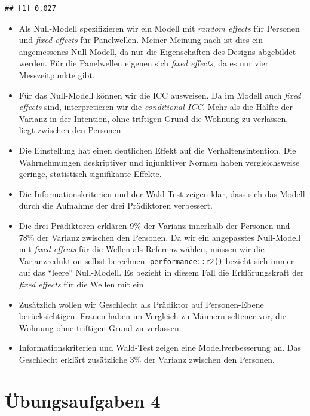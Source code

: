 \documentclass[
]{book}
\begin{document}
\begin{verbatim}
## [1] 0.027
\end{verbatim}

\begin{itemize}
\item
  Als Null-Modell spezifizieren wir ein Modell mit \emph{random effects} für Personen und \emph{fixed effects} für Panelwellen. Meiner Meinung nach ist dies ein angemessenes Null-Modell, da nur die Eigenschaften des Designs abgebildet werden. Für die Panelwellen eigenen sich \emph{fixed effects}, da es nur vier Messzeitpunkte gibt.
\item
  Für das Null-Modell können wir die ICC ausweisen. Da im Modell auch \emph{fixed effects} sind, interpretieren wir die \emph{conditional ICC}. Mehr als die Hälfte der Varianz in der Intention, ohne triftigen Grund die Wohnung zu verlassen, liegt zwischen den Personen.
\item
  Die Einstellung hat einen deutlichen Effekt auf die Verhaltensintention. Die Wahrnehmungen deskriptiver und injunktiver Normen haben vergleichsweise geringe, statistisch signifikante Effekte.
\item
  Die Informationskriterien und der Wald-Test zeigen klar, dass sich das Modell durch die Aufnahme der drei Prädiktoren verbessert.
\item
  Die drei Prädiktoren erklären 9\% der Varianz innerhalb der Personen und 78\% der Varianz zwischen den Personen. Da wir ein angepasstes Null-Modell mit \emph{fixed effects} für die Wellen als Referenz wählen, müssen wir die Varianzreduktion selbst berechnen. \texttt{performance::r2()} bezieht sich immer auf das ``leere'' Null-Modell. Es bezieht in diesem Fall die Erklärungskraft der \emph{fixed effects} für die Wellen mit ein.
\item
  Zusätzlich wollen wir Geschlecht als Prädiktor auf Personen-Ebene berücksichtigen. Frauen haben im Vergleich zu Männern seltener vor, die Wohnung ohne triftigen Grund zu verlassen.
\item
  Informationskriterien und Wald-Test zeigen eine Modellverbesserung an. Das Geschlecht erklärt zusätzliche 3\% der Varianz zwischen den Personen.
\end{itemize}

\hypertarget{uxfcbungsaufgaben-4}{%
\section{Übungsaufgaben 4}\label{uxfcbungsaufgaben-4}}
\end{document}
